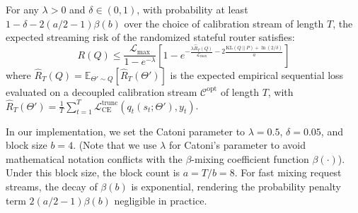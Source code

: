 \begin{theorem}
\label{thm:pac_bayes}
For any $\lambda > 0$ and $\delta \in (0, 1)$, with probability at least $1 - \delta - 2(a/2 - 1)\beta(b)$ over the choice of calibration stream of length $T$, the expected streaming risk of the randomized stateful router satisfies:
\begin{equation}
    R(Q) \le \frac{\mathcal{L}_{\max}}{1 - e^{-\lambda}} \left[ 1 - e^{ -\frac{\lambda \hat{R}_T(Q)}{\mathcal{L}_{\max}} - 2 \frac{\text{KL}(Q \| P) + \ln(2/\delta)}{a} } \right]
\end{equation}
where $\hat{R}_T(Q) = \mathbb{E}_{\Theta' \sim Q}[\hat{R}_T(\Theta')]$ is the expected empirical sequential loss evaluated on a decoupled calibration stream $\mathcal{C}^{\text{opt}}$ of length $T$, with $\hat{R}_T(\Theta') = \frac{1}{T} \sum_{t=1}^T \mathcal{L}_{\text{CE}}^{\text{trunc}}(q_t(s_t; \Theta'), y_t)$.
\end{theorem}

In our implementation, we set the Catoni parameter to $\lambda = 0.5$, $\delta = 0.05$, and block size $b = 4$. (Note that we use $\lambda$ for Catoni's parameter to avoid mathematical notation conflicts with the $\beta$-mixing coefficient function $\beta(\cdot)$). Under this block size, the block count is $a = T/b = 8$. For fast mixing request streams, the decay of $\beta(b)$ is exponential, rendering the probability penalty term $2(a/2 - 1)\beta(b)$ negligible in practice. 

